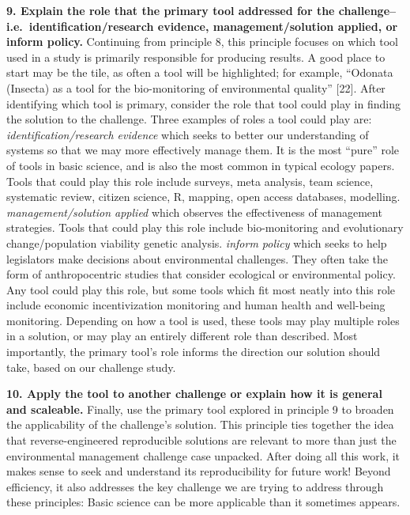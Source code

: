 \documentclass[10pt,letterpaper]{article}
\begin{document}
\textbf{9. Explain the role that the primary tool addressed for the
challenge--i.e.~identification/research evidence, management/solution
applied, or inform policy.} Continuing from principle 8, this principle
focuses on which tool used in a study is primarily responsible for
producing results. A good place to start may be the tile, as often a
tool will be highlighted; for example, ``Odonata (Insecta) as a tool for
the bio-monitoring of environmental quality'' {[}22{]}. After
identifying which tool is primary, consider the role that tool could
play in finding the solution to the challenge. Three examples of roles a
tool could play are: \emph{identification/research evidence} which seeks
to better our understanding of systems so that we may more effectively
manage them. It is the most ``pure'' role of tools in basic science, and
is also the most common in typical ecology papers. Tools that could play
this role include surveys, meta analysis, team science, systematic
review, citizen science, R, mapping, open access databases, modelling.
\emph{management/solution applied} which observes the effectiveness of
management strategies. Tools that could play this role include
bio-monitoring and evolutionary change/population viability genetic
analysis. \emph{inform policy} which seeks to help legislators make
decisions about environmental challenges. They often take the form of
anthropocentric studies that consider ecological or environmental
policy. Any tool could play this role, but some tools which fit most
neatly into this role include economic incentivization monitoring and
human health and well-being monitoring. Depending on how a tool is used,
these tools may play multiple roles in a solution, or may play an
entirely different role than described. Most importantly, the primary
tool's role informs the direction our solution should take, based on our
challenge study.

\textbf{10. Apply the tool to another challenge or explain how it is
general and scaleable.} Finally, use the primary tool explored in
principle 9 to broaden the applicability of the challenge's solution.
This principle ties together the idea that reverse-engineered
reproducible solutions are relevant to more than just the environmental
management challenge case unpacked. After doing all this work, it makes
sense to seek and understand its reproducibility for future work! Beyond
efficiency, it also addresses the key challenge we are trying to address
through these principles: Basic science can be more applicable than it
sometimes appears.
\end{document}
